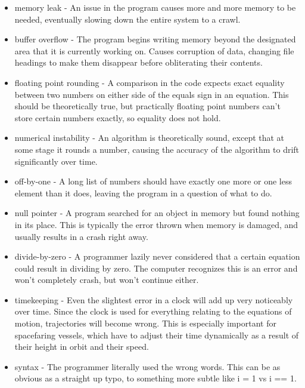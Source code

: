 \documentclass[a4paper]{article}
\begin{document}
\begin{minipage}[t]{0.45\linewidth}
\begin{itemize}[leftmargin=0cm]
\item memory leak - An issue in the program causes more and more memory to be needed, eventually slowing down the entire system to a crawl.
\item buffer overflow - The program begins writing memory beyond the designated area that it is currently working on. Causes corruption of data, changing file headings to make them disappear before obliterating their contents.
\item floating point rounding - A comparison in the code expects exact equality between two numbers on either side of the equals sign in an equation. This should be theoretically true, but practically floating point numbers can't store certain numbers exactly, so equality does not hold. 
\item numerical instability - An algorithm is theoretically sound, except that at some stage it rounds a number, causing the accuracy of the algorithm to drift significantly over time.
\item off-by-one - A long list of numbers should have exactly one more or one less element than it does, leaving the program in a question of what to do. 
\end{itemize}
\end{minipage}
\begin{minipage}[t]{0.5\linewidth}
\begin{itemize}[leftmargin=0.5cm]
\item null pointer - A program searched for an object in memory but found nothing in its place. This is typically the error thrown when memory is damaged, and usually results in a crash right away.
\item divide-by-zero - A programmer lazily never considered that a certain equation could result in dividing by zero. The computer recognizes this is an error and won't completely crash, but won't continue either.
\item timekeeping - Even the slightest error in a clock will add up very noticeably over time. Since the clock is used for everything relating to the equations of motion, trajectories will become wrong. This is especially important for spacefaring vessels, which have to adjust their time dynamically as a result of their height in orbit and their speed. 
\item syntax - The programmer literally used the wrong words. This can be as obvious as a straight up typo, to something more subtle like i = 1 vs i == 1.
\end{itemize}
\end{minipage}
\end{document}
